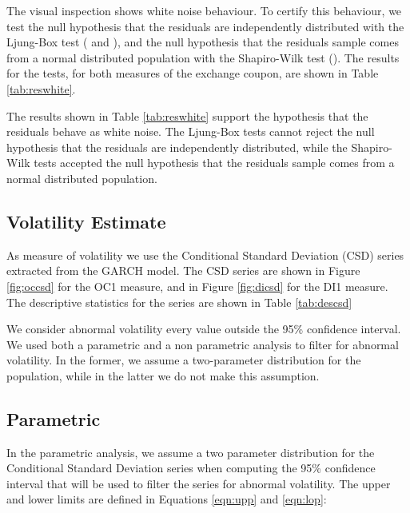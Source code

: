 \documentclass[cic,tc, english]{iiufrgs}
\begin{document}
    

    

    The visual inspection shows white noise behaviour. To certify this behaviour, we test the null hypothesis that the residuals are independently distributed with the Ljung-Box test (\citet{boxpierce} and \citet{ljungbox}), and the null hypothesis that the residuals sample comes from a normal distributed population with the Shapiro-Wilk test (\citet{shapirowilk}). The results for the tests, for both measures of the exchange coupon, are shown in Table \ref{tab:reswhite}.

    

    The results shown in Table \ref{tab:reswhite} support the hypothesis that the residuals behave as white noise. The Ljung-Box tests cannot reject the null hypothesis that the residuals are independently distributed, while the Shapiro-Wilk tests accepted the null hypothesis that the residuals sample comes from a normal distributed population.

\subsection{Volatility Estimate}

    As measure of volatility we use the Conditional Standard Deviation (CSD) series extracted from the GARCH model. The CSD series are shown in Figure \ref{fig:occsd} for the OC1 measure, and in Figure \ref{fig:dicsd} for the DI1 measure. The descriptive statistics for the series are shown in Table \ref{tab:descsd}

    

    

    

    We consider abnormal volatility every value outside the 95\% confidence interval. We used both a parametric and a non parametric analysis to filter for abnormal volatility. In the former, we assume a two-parameter distribution for the population, while in the latter we do not make this assumption.

\subsection{Parametric}

    In the parametric analysis, we assume a two parameter distribution for the Conditional Standard Deviation series when computing the 95\% confidence interval that will be used to filter the series for abnormal volatility. The upper and lower limits are defined in Equations \ref{eqn:upp} and \ref{eqn:lop}: 
\end{document}
